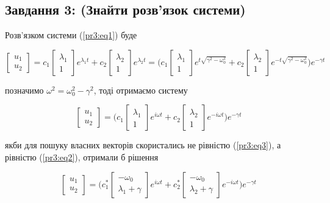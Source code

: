 \subsection{Завдання 3: (Знайти розв'язок системи)}

Розв'язком системи (\ref{pr3:eq1}) буде 

$$
    \begin{bmatrix}
        u_1 \\ u_2
    \end{bmatrix} = 
    c_1 \begin{bmatrix}
        \lambda_1 \\1
    \end{bmatrix} e^{\lambda_1 t} + 
    c_2 \begin{bmatrix}
        \lambda_2 \\1
    \end{bmatrix} e^{\lambda_2 t} = \Bigg(
    c_1 \begin{bmatrix}
        \lambda_1 \\1
    \end{bmatrix} e^{t\sqrt{\gamma^2 - \omega_0^2}} + 
    c_2 \begin{bmatrix}
        \lambda_2 \\1
    \end{bmatrix} e^{-t\sqrt{\gamma^2 - \omega_0^2}} \Bigg) e^{-\gamma t}
$$

позначимо $\omega^2 = \omega_0^2 - \gamma^2$, тоді отримаємо систему

\begin{equation}\label{pr3:solution}
    \begin{bmatrix}
        u_1 \\ u_2
    \end{bmatrix} =  \Bigg(
    c_1 \begin{bmatrix}
        \lambda_1 \\1
    \end{bmatrix} e^{i\omega t} + 
    c_2 \begin{bmatrix}
        \lambda_2 \\1
    \end{bmatrix} e^{-i\omega t} \Bigg) e^{-\gamma t}
\end{equation}



якби для пошуку власних векторів скористались не рівністю (\ref{pr3:eq3}), а рівністю
(\ref{pr3:eq2}), отримали б рішення

$$
\begin{bmatrix}
    u_1 \\ u_2
\end{bmatrix} =  \Bigg(
c_1^* \begin{bmatrix}
    -\omega_0 \\ \lambda_1 + \gamma
\end{bmatrix} e^{i\omega t} + 
c_2^* \begin{bmatrix}
    -\omega_0 \\\lambda_2 + \gamma
\end{bmatrix} e^{-i\omega t} \Bigg) e^{-\gamma t}
$$